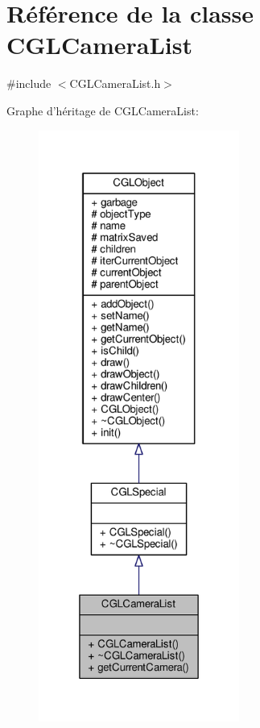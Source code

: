 \hypertarget{class_c_g_l_camera_list}{\section{Référence de la classe C\-G\-L\-Camera\-List}
\label{class_c_g_l_camera_list}
}


{\ttfamily \#include $<$C\-G\-L\-Camera\-List.\-h$>$}



Graphe d'héritage de C\-G\-L\-Camera\-List\-:\nopagebreak
\begin{figure}[H]
\begin{center}
\leavevmode
\includegraphics[height=550pt]{dc/dfa/class_c_g_l_camera_list__inherit__graph}
\end{center}
\end{figure}


